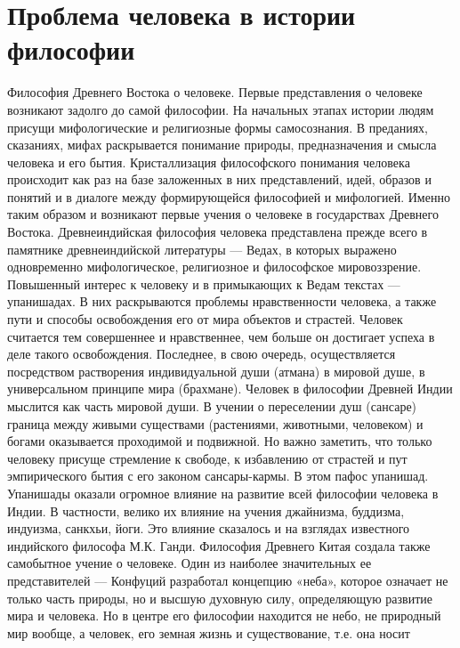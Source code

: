 \documentclass[12pt]{article}
\begin{document}
\newpage
\section{Проблема человека в истории философии}
Философия Древнего Востока о человеке.
Первые  представления о человеке  возникают задолго до  самой  философии.  На начальных этапах истории
людям  присущи  мифологические  и  религиозные  формы  самосознания.  В  преданиях,  сказаниях,  мифах
раскрывается  понимание  природы,  предназначения  и  смысла  человека  и  его  бытия.  Кристаллизация
философского понимания человека происходит как раз на базе заложенных в них представлений, идей, образов
и понятий и в диалоге между формирующейся философией и мифологией. Именно таким образом и возникают
первые учения о человеке в государствах Древнего Востока.
Древнеиндийская философия человека представлена прежде всего в памятнике древнеиндийской литературы —
Ведах,  в  которых  выражено  одновременно  мифологическое,  религиозное  и  философское  мировоззрение.
Повышенный интерес к человеку и в примыкающих к Ведам текстах — упанишадах. В них раскрываются
проблемы нравственности человека, а также пути и способы освобождения его от мира объектов и страстей.
Человек  считается  тем  совершеннее  и  нравственнее,  чем  больше  он  достигает  успеха  в  деле  такого 
освобождения. Последнее, в свою очередь, осуществляется посредством растворения индивидуальной души
(атмана) в мировой душе, в универсальном принципе мира (брахмане).
Человек  в  философии  Древней  Индии  мыслится  как  часть  мировой  души.  В  учении  о  переселении  душ
(сансаре)  граница  между  живыми  существами  (растениями,  животными,  человеком)  и  богами  оказывается
проходимой  и  подвижной.  Но  важно  заметить,  что  только  человеку  присуще  стремление  к  свободе,  к
избавлению от страстей и пут эмпирического бытия с его законом сансары-кармы. В этом пафос упанишад.
Упанишады оказали огромное влияние на развитие всей философии человека в Индии. В частности, велико их
влияние  на  учения  джайнизма,  буддизма,  индуизма,  санкхьи,  йоги.  Это  влияние  сказалось  и  на  взглядах
известного индийского философа М.К. Ганди.
Философия Древнего Китая создала также самобытное учение о человеке. Один из наиболее значительных ее
представителей — Конфуций разработал концепцию «неба», которое означает не только часть природы, но и
высшую духовную силу, определяющую развитие мира и человека. Но в центре его философии находится не
небо,  не  природный  мир  вообще,  а  человек,  его  земная  жизнь  и  существование,  т.е.  она  носит
\end{document}
